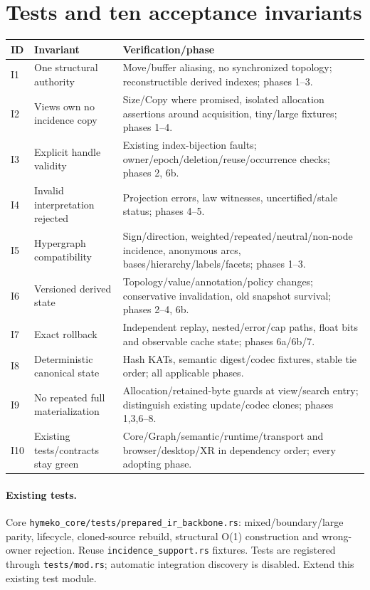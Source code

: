 \documentclass[10pt,a4paper]{article}
\newcommand{\code}[1]{{\small\nolinkurl{#1}}}
\begin{document}
\section{Tests and ten acceptance invariants}
\label{sec:tests}
\begin{longtable}{L{9mm}L{54mm}L{99mm}}
\toprule ID & Invariant & Verification/phase\\\midrule
I1 & One structural authority & Move/buffer aliasing, no synchronized topology; reconstructible derived indexes; phases 1--3.\\
I2 & Views own no incidence copy & Size/Copy where promised, isolated allocation assertions around acquisition, tiny/large fixtures; phases 1--4.\\
I3 & Explicit handle validity & Existing index-bijection faults; owner/epoch/deletion/reuse/occurrence checks; phases 2, 6b.\\
I4 & Invalid interpretation rejected & Projection errors, law witnesses, uncertified/stale status; phases 4--5.\\
I5 & Hypergraph compatibility & Sign/direction, weighted/repeated/neutral/non-node incidence, anonymous arcs, bases/hierarchy/labels/facets; phases 1--3.\\
I6 & Versioned derived state & Topology/value/annotation/policy changes; conservative invalidation, old snapshot survival; phases 2--4, 6b.\\
I7 & Exact rollback & Independent replay, nested/error/cap paths, float bits and observable cache state; phases 6a/6b/7.\\
I8 & Deterministic canonical state & Hash KATs, semantic digest/codec fixtures, stable tie order; all applicable phases.\\
I9 & No repeated full materialization & Allocation/retained-byte guards at view/search entry; distinguish existing update/codec clones; phases 1,3,6--8.\\
I10 & Existing tests/contracts stay green & Core/Graph/semantic/runtime/transport and browser/desktop/XR in dependency order; every adopting phase.\\
\bottomrule
\end{longtable}
\paragraph{Existing tests.}
Core \code{hymeko_core/tests/prepared_ir_backbone.rs}: mixed/boundary/large parity, lifecycle, cloned-source rebuild, structural O(1) construction and wrong-owner rejection. Reuse \code{incidence_support.rs} fixtures. Tests are registered through \code{tests/mod.rs}; automatic integration discovery is disabled. Extend this existing test module.
\end{document}
